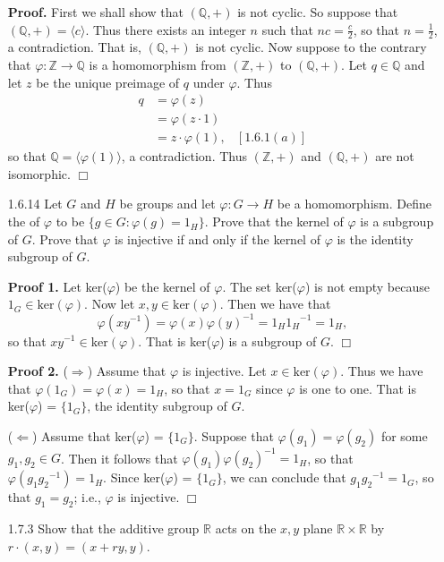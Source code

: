 \documentclass[9pt]{article}
\newcommand{\qed}{\hfill \ensuremath{\Box}}
\newcommand{\cyc}[1]{\langle #1 \rangle}
\newcommand{\Z}{\mathbb{Z}}
\newcommand{\R}{\mathbb{R}}
\newcommand{\Q}{\mathbb{Q}}
\newcommand{\D}{\displaystyle}
\begin{document}
\begin{enumerate}
      \textbf{Proof.} First we shall show that $(\Q, +)$ is not cyclic. So
      suppose that $(\Q, +) = \cyc{c}$. Thus there exists an integer $n$ such 
      that $nc = \D\frac{c}{2}$, so that $\D n = \frac{1}{2}$, a contradiction. 
      That is, $(\Q, +)$ is not cyclic. Now suppose to the contrary that
      $\varphi : \Z \rightarrow \Q$ is a homomorphism from $(\Z, +)$ to
      $(\Q, +)$. Let $q \in \Q$ and let $z$ be the unique preimage of $q$ under
      $\varphi$. Thus
      \begin{align*}
         q &= \varphi(z) \\
           &= \varphi(z \cdot 1) \\
           &= z \cdot \varphi(1),  &[1.6.1(a)]
      \end{align*}
      so that $\Q = \cyc{\varphi(1)}$, a contradiction. Thus $(\Z, +)$ and
      $(\Q, +)$ are not isomorphic. \qed
   \item[1.6.14]  Let $G$ and $H$ be groups and let $\varphi : G \rightarrow H$
                  be a homomorphism. Define the  of $\varphi$ to be
                  $\{g \in G : \varphi(g) = 1_H\}$. Prove that the kernel of
                  $\varphi$ is a subgroup of $G$. Prove that $\varphi$ is
                  injective if and only if the kernel of $\varphi$ is the
                  identity subgroup of $G$.

      \textbf{Proof 1.} Let ker($\varphi$) be the kernel of $\varphi$. The set
      ker($\varphi$) is not empty because $1_G \in \text{ker}(\varphi)$. Now let
      $x, y \in \text{ker}(\varphi)$. Then we have that
      $$\varphi(xy^{-1}) = \varphi(x)\varphi(y)^{-1} = 1_H{1_H}^{-1} = 1_H,$$
      so that $xy^{-1} \in \text{ker}(\varphi)$. That is ker($\varphi$) is a
      subgroup of $G$. \qed

      \textbf{Proof 2.} ($\Rightarrow$) Assume that $\varphi$ is injective. Let
      $x \in \text{ker}(\varphi)$. Thus we have that
      $\varphi(1_G) = \varphi(x) = 1_H$, so that $x = 1_G$ since $\varphi$ is
      one to one. That is ker($\varphi$) = $\{1_G\}$, the identity subgroup of
      $G$.

      ($\Leftarrow$) Assume that ker($\varphi$) = $\{1_G\}$. Suppose that
      $\varphi(g_1) = \varphi(g_2)$ for some $g_1, g_2 \in G$. Then it follows
      that $\varphi(g_1)\varphi(g_2)^{-1} = 1_H$, so that
      $\varphi(g_1{g_2}^{-1}) = 1_H$. Since ker($\varphi$) = $\{1_G\}$, we can
      conclude that $g_1{g_2}^{-1} = 1_G$, so that $g_1 = g_2$; i.e., $\varphi$
      is injective. \qed
   \item[1.7.3]   Show that the additive group $\R$ acts on the $x, y$ plane
                  $\R \times \R$ by $r \cdot (x, y) = (x + ry, y)$.


\end{enumerate}
\end{document}
